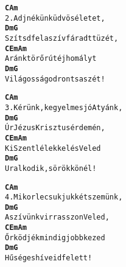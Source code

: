 \newpage
{}
\kottastart
{}
\kottaend
\begin{minipage}{\textwidth}
\begin{multicols}{2}
\begin{minipage}{\textwidth}
\begin{alltt}
\textbf{   C                Am}
2. Adj nékünk üdvös életet,
\textbf{     Dm                 G}
   Szítsd fel a szív fáradt tüzét,
\textbf{   C         Em    Am}
   A ránk törő rút éjhomályt
\textbf{   Dm            G}
   Világosságod rontsa szét!
\end{alltt}
\vspace{0.0cm}
\versszakspacing
\end{minipage}
\begin{minipage}{\textwidth}
\begin{alltt}
\textbf{    C                 Am}
3. Kérünk, kegyelmes jó Atyánk,
\textbf{   Dm                G}
   Úr Jézus Krisztus érdemén,
\textbf{   C          Em    Am}
   Ki Szentlélekkel és Veled
\textbf{   Dm             G}
   Uralkodik, s örökkön él!
\end{alltt}
\vspace{0.0cm}
\versszakspacing
\end{minipage}
\begin{minipage}{\textwidth}
\begin{alltt}
\textbf{    C               Am}
4. Mikor lecsukjuk két szemünk,
\textbf{   Dm                G}
   A szívünk virrasszon Veled,
\textbf{   C         Em     Am}
   Őrködjék mindig jobb kezed
\textbf{   Dm          G}
   Hűséges híveid felett!
\end{alltt}
\vspace{0.0cm}
\versszakspacing
\end{minipage}
\vspace{0.2cm}
\end{multicols}
\end{minipage}


